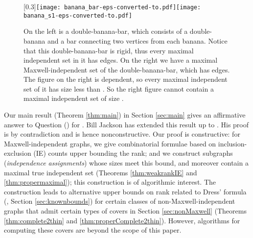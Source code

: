\documentclass[10pt]{article}
\begin{document}
\begin{center}
\begin{figure}[!h]
\begin{center}
\scalebox{0.3}[0.3]{\texttt{[image: banana\_bar-eps-converted-to.pdf]}\texttt{[image: banana\_s1-eps-converted-to.pdf]} }
\end{center}
\caption{On the left is a double-banana-bar, which consists of a double-banana and a bar connecting two vertices from each banana. Notice that this double-banana-bar is rigid, thus every maximal independent set in it has  edges. On the right we have a maximal Maxwell-independent set of the double-banana-bar, which has  edges. The figure on the right is dependent, so every maximal independent set of it has size less than . So the right figure cannot contain a maximal independent set of size . }\label{fig:bananaBar}
\end{figure}
\end{center}

\medskip
\noindent
Our main result (Theorem \ref{thm:main}) in Section \ref{sec:main} gives an affirmative answer to Question () for . Bill Jackson \cite{JacksonBound2011} has extended this result up to . His proof is by contradiction and is hence nonconstructive. Our proof is constructive: for Maxwell-independent graphs, we give combinatorial formulae based on inclusion-exclusion (IE) counts upper bounding the rank; and we construct subgraphs ({\em independence assignments}) whose sizes meet this bound, and moreover contain a maximal true independent set (Theorems \ref{thm:weakrankIE} and \ref{thm:propermaximal}); this construction is of algorithmic interest. The construction leads to alternative upper bounds on rank related to Dress' formula (\cite{bib:Dress}, Section \ref{sec:knownbounds}) for certain classes of non-Maxwell-independent graphs that admit certain types of covers in Section \ref{sec:nonMaxwell} (Theorems \ref{thm:complete2thin} and \ref{thm:properComplete2thin}). However, algorithms for computing these covers are beyond the scope of this paper.
\begin{comment}
it uses Lemma \ref{lem:comb}(\ref{thm:9tree}) which elucidates the structure of a special type of cover that can always be found for Maxwell-independent but
non-Maxwell-rigid graphs. This structure is of independent interest and is exploited (by Proposition \ref{obs:rankIE}) employing a commonly used rank inclusion-exclusion (IE) count. Our best bound (in Theorem \ref{thm:weakrankIE}) is employed in answering both Questions 1 (Theorem \ref{thm:main}) and 2 (Proposition \ref{obs:rankIE} and Theorem \ref{thm:propermaximal}). 
\end{comment}
\end{document}
